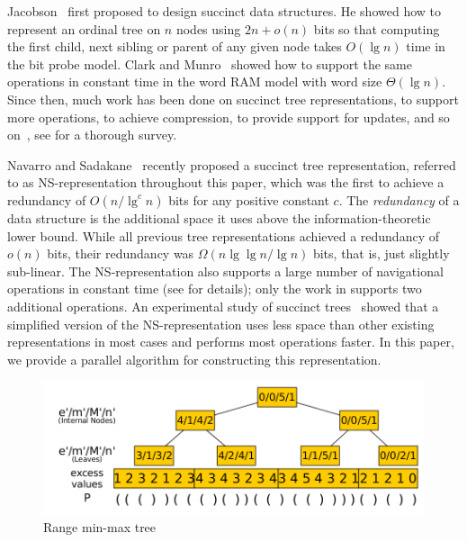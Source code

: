 Jacobson~\cite{j1989} first proposed to design succinct data
structures.  He showed how to represent an ordinal tree on $n$ nodes
using $2n+o(n)$ bits so that computing the first child, next sibling
or parent of any given node takes $O(\lg n)$ time in the bit probe
model.  Clark and Munro~\cite{cm1996} showed how to support the same
operations in constant time in the word RAM model with word size
$\Theta(\lg n)$.  Since then, much work has been done on succinct tree
representations, to support more operations, to achieve compression,
to provide support for updates, and so
on~\cite{mr1997,bdmr1999,grr2004,jss2007,ly2008,hms2012,fm2014,Navarro:2014:FFS:2620785.2601073},
see \cite{rr2013} for a thorough survey.

Navarro and Sadakane~\cite{Navarro:2014:FFS:2620785.2601073} recently
proposed a succinct tree representation, referred to as
NS-representation throughout this paper, which was the first to
achieve a redundancy of $O(n/\lg^c n)$ bits for any positive constant
$c$.  The \emph{redundancy} of a data structure is the additional
space it uses above the information-theoretic lower bound.  While all
previous tree representations achieved a redundancy of $o(n)$ bits,
their redundancy was $\Omega(n \lg\lg n / \lg n)$ bits, that is, just
slightly sub-linear.  The NS-representation also supports a large
number of navigational operations in constant time (see
\cite{Navarro:2014:FFS:2620785.2601073} for details); only the work in
\cite{hms2012,fm2014} supports two additional operations.  An
experimental study of succinct trees~\cite{ACNSalenex10} showed that a
simplified version of the NS-representation uses less space than other
existing representations in most cases and performs most operations
faster.  In this paper, we provide a parallel algorithm for
constructing this representation.

\begin{figure}[t]
  \centering
  \includegraphics[scale=0.28]{./images/Range-min-max-tree.png}
  \caption{Range min-max tree}
  \label{fig:RangeMinMaxTree}
\vspace{-20pt}
\end{figure}

